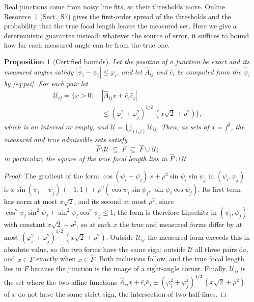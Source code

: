 \documentclass[pdflatex,sn-mathphys-num,iicol]{sn-jnl}
\newcommand{\OR}{Online Resource~1}
\theoremstyle{thmstyleone}
\newtheorem{proposition}[theorem]{Proposition}
\theoremstyle{thmstylethree}
\theoremstyle{thmstyletwo}
\begin{document}
Real junctions come from noisy line fits, so their thresholds move. \OR{} (Sect.~S7) gives the first-order spread of the thresholds and the probability that the true focal length leaves the measured set. Here we give a deterministic guarantee instead: whatever the source of error, it suffices to bound how far each measured angle can be from the true one.

\begin{proposition}[Certified bounds]\label{prop:certified}
Let the position of a junction be exact and its measured angles satisfy $|\hat\psi_i-\psi_i|\le\varphi_i$, and let $\hat A_{ij}$ and $\hat e_i$ be computed from the $\hat\psi_i$ by \eqref{eq:psi}. For each pair let
\[
\begin{aligned}
\mathcal U_{ij}=\bigl\{x>0:\ &|\hat A_{ij}x+\hat e_i\hat e_j|\\
&\le(\varphi_i^2+\varphi_j^2)^{1/2}\,(x\sqrt2+\rho^2)\bigr\},
\end{aligned}
\]
which is an interval or empty, and $\mathcal U=\bigcup_{(i,j)}\mathcal U_{ij}$. Then, as sets of $x=f^2$, the measured and true admissible sets satisfy
\[
\hat F\setminus\mathcal U\;\subseteq\;F\;\subseteq\;\hat F\cup\mathcal U ;
\]
in particular, the square of the true focal length lies in $\hat F\cup\mathcal U$.
\end{proposition}
\begin{proof}
The gradient of the form $\cos(\psi_i-\psi_j)\,x+\rho^2\sin\psi_i\sin\psi_j$ in $(\psi_i,\psi_j)$ is $x\sin(\psi_i-\psi_j)\,(-1,1)+\rho^2(\cos\psi_i\sin\psi_j,\ \sin\psi_i\cos\psi_j)$. Its first term has norm at most $x\sqrt2$, and its second at most $\rho^2$, since $\cos^2\psi_i\sin^2\psi_j+\sin^2\psi_i\cos^2\psi_j\le1$; the form is therefore Lipschitz in $(\psi_i,\psi_j)$ with constant $x\sqrt2+\rho^2$, so at each $x$ the true and measured forms differ by at most $(\varphi_i^2+\varphi_j^2)^{1/2}\,(x\sqrt2+\rho^2)$. Outside $\mathcal U_{ij}$ the measured form exceeds this in absolute value, so the two forms have the same sign; outside $\mathcal U$ all three pairs do, and $x\in F$ exactly when $x\in\hat F$. Both inclusions follow, and the true focal length lies in $F$ because the junction is the image of a right-angle corner. Finally, $\mathcal U_{ij}$ is the set where the two affine functions $\hat A_{ij}x+\hat e_i\hat e_j\pm(\varphi_i^2+\varphi_j^2)^{1/2}\,(x\sqrt2+\rho^2)$ of $x$ do not have the same strict sign, the intersection of two half-lines.
\end{proof}
\end{document}
